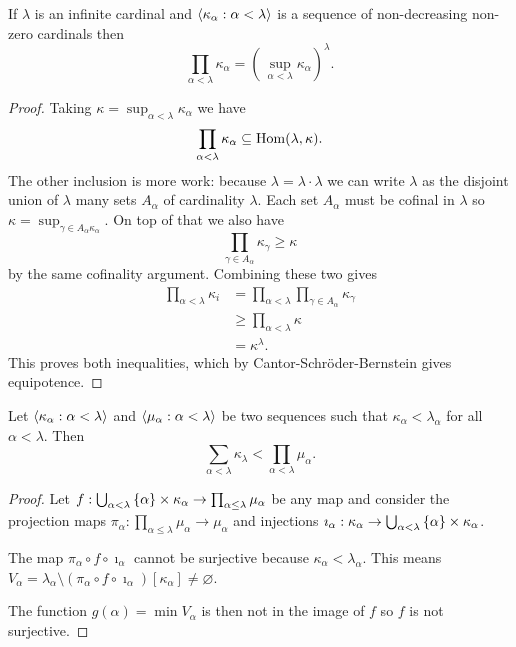 \begin{proposition}
    If \(\lambda\) is an infinite cardinal and
    \(\left<\kappa_{\alpha}:\alpha<\lambda\right>\) is a sequence of
    non-decreasing non-zero cardinals then
    \[
        \prod_{\alpha<\lambda}\kappa_{\alpha}=\left(\,\sup_{\alpha<\lambda}\kappa_{\alpha}\right)^{\lambda}.
    \]

    \begin{proof}
        Taking \(\kappa=\sup_{\alpha<\lambda}\kappa_{\alpha}\) we have
        \[
            \prod_{\alpha<\lambda}\kappa_{\alpha}\subseteq\operatorname{Hom}(\lambda,\kappa).
        \]
        The other inclusion is more work: because
        \(\lambda=\lambda\cdot\lambda\) we can write \(\lambda\) as the disjoint
        union of \(\lambda\) many sets \(A_{\alpha}\) of cardinality
        \(\lambda\). Each set \(A_{\alpha}\) must be cofinal in \(\lambda\) so
        \(\kappa=\sup_{\gamma\in A_{\alpha}\kappa_{\alpha}}\). On top of that we
        also have
        \[
            \prod_{\gamma\in A_{\alpha}}\kappa_{\gamma}\geq\kappa
        \]
        by the same cofinality argument. Combining these two gives
        \begin{align*}
            \prod_{\alpha<\lambda}\kappa_{i} & =\prod_{\alpha<\lambda}\prod_{\gamma\in A_{\alpha}}\kappa_{\gamma} \\
                                             & \geq\prod_{\alpha<\lambda}\kappa                                   \\
                                             & =\kappa^{\lambda}.
        \end{align*}
        This proves both inequalities, which by Cantor-Schröder-Bernstein gives
        equipotence.
    \end{proof}
\end{proposition}

\begin{theorem}
    Let \(\left<\kappa_{\alpha}:\alpha<\lambda\right>\) and
    \(\left<\mu_{\alpha}:\alpha<\lambda\right>\) be two sequences such that
    \(\kappa_{\alpha}<\lambda_{\alpha}\) for all \(\alpha<\lambda\). Then
    \[
        \sum_{\alpha<\lambda}\kappa_{\lambda}<\prod_{\alpha<\lambda}\mu_{\alpha}.
    \]

    \begin{proof}
        Let
        \(f:\bigcup_{\alpha<\lambda}\left\{\alpha\right\}\times\kappa_{\alpha}\to\prod_{\alpha\leq\lambda}\mu_{\alpha}\)
        be any map and consider the projection maps
        \(\pi_{\alpha}:\prod_{\alpha\leq\lambda}\mu_{\alpha}\to\mu_{\alpha}\)
        and injections
        \(\imath_{\alpha}:\kappa_{\alpha}\to\bigcup_{\alpha<\lambda}\left\{\alpha\right\}\times\kappa_{\alpha}\).

        The map \(\pi_{\alpha}\circ f\circ\imath_{\alpha}\) cannot be surjective
        because \(\kappa_{\alpha}<\lambda_{\alpha}\). This means
        \(V_{\alpha}=\lambda_{\alpha}\setminus(\pi_{\alpha}\circ
        f\circ\imath_{\alpha})[\kappa_{\alpha}]\neq\varnothing\).

        The function \(g(\alpha)=\min V_{\alpha}\) is then not in the image of
        \(f\) so \(f\) is not surjective.
    \end{proof}
\end{theorem}

